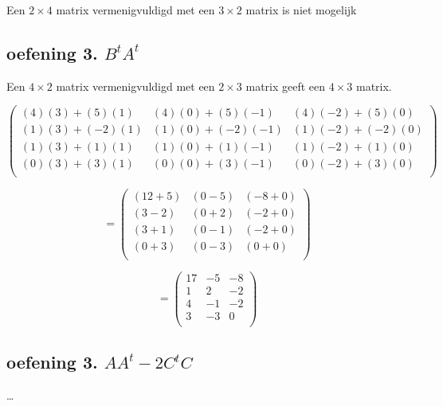 \documentclass[11pt, a4paper]{article}
\begin{document}
Een $2\times4$ matrix vermenigvuldigd met een $3\times2$ matrix is niet mogelijk

\subsection*{oefening 3. ${B}^t{A}^t$}

Een $4\times2$ matrix vermenigvuldigd met een $2\times3$ matrix geeft een $4\times3$ matrix.

\[
\begin{pmatrix}
	(4)(3)+(5)(1) 	& (4)(0)+(5)(-1) 	& (4)(-2)+(5)(0) \\
	(1)(3)+(-2)(1) 	& (1)(0)+(-2)(-1) 	& (1)(-2)+(-2)(0) \\
	(1)(3)+(1)(1) 	& (1)(0)+(1)(-1) 	& (1)(-2)+(1)(0) \\
	(0)(3)+(3)(1) 	& (0)(0)+(3)(-1) 	& (0)(-2)+(3)(0) \\
\end{pmatrix}
\]

\[
= \begin{pmatrix}
	(12+5) 	& (0-5) & (-8+0) \\
	(3-2) 	& (0+2) & (-2+0) \\
	(3+1) 	& (0-1) & (-2+0) \\
	(0+3) 	& (0-3) & (0+0) \\
\end{pmatrix}
\]

\[
= \begin{pmatrix}
	17 & -5 & -8 \\
	1 & 2 & -2 \\
	4 & -1 & -2 \\
	3 & -3 & 0 \\
\end{pmatrix}
\]


\subsection*{oefening 3. $A{A}^t - 2{C}^t C$}





\ldots
\end{document}
